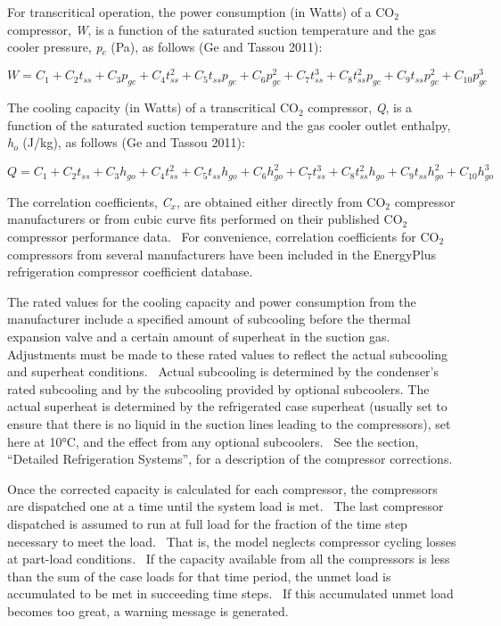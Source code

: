 For transcritical operation, the power consumption (in Watts) of a CO\(_{2}\) compressor, \emph{W}, is a function of the saturated suction temperature and the gas cooler pressure, \emph{p\(_{c}\)} (Pa), as follows (Ge and Tassou 2011):

\begin{equation}
W = {C_1} + {C_2}{t_{ss}} + {C_3}{p_{gc}} + {C_4}t_{ss}^2 + {C_5}{t_{ss}}{p_{gc}} + {C_6}p_{gc}^2 + {C_7}t_{ss}^3 + {C_8}t_{ss}^2{p_{gc}} + {C_9}{t_{ss}}p_{gc}^2 + {C_{10}}p_{gc}^3
\end{equation}

The cooling capacity (in Watts) of a transcritical CO\(_{2}\) compressor, \emph{Q}, is a function of the saturated suction temperature and the gas cooler outlet enthalpy, \emph{h\(_{o}\)} (J/kg), as follows (Ge and Tassou 2011):

\begin{equation}
Q = {C_1} + {C_2}{t_{ss}} + {C_3}{h_{go}} + {C_4}t_{ss}^2 + {C_5}{t_{ss}}{h_{go}} + {C_6}h_{go}^2 + {C_7}t_{ss}^3 + {C_8}t_{ss}^2{h_{go}} + {C_9}{t_{ss}}h_{go}^2 + {C_{10}}h_{go}^3
\end{equation}

The correlation coefficients, \emph{C\(_{x}\)}, are obtained either directly from CO\(_{2}\) compressor manufacturers or from cubic curve fits performed on their published CO\(_{2}\) compressor performance data.~ For convenience, correlation coefficients for CO\(_{2}\) compressors from several manufacturers have been included in the EnergyPlus refrigeration compressor coefficient database.

The rated values for the cooling capacity and power consumption from the manufacturer include a specified amount of subcooling before the thermal expansion valve and a certain amount of superheat in the suction gas.~ Adjustments must be made to these rated values to reflect the actual subcooling and superheat conditions.~ Actual subcooling is determined by the condenser's rated subcooling and by the subcooling provided by optional subcoolers. The actual superheat is determined by the refrigerated case superheat (usually set to ensure that there is no liquid in the suction lines leading to the compressors), set here at 10°C, and the effect from any optional subcoolers.~ See the section, ``Detailed Refrigeration Systems'', for a description of the compressor corrections.

Once the corrected capacity is calculated for each compressor, the compressors are dispatched one at a time until the system load is met.~ The last compressor dispatched is assumed to run at full load for the fraction of the time step necessary to meet the load.~ That is, the model neglects compressor cycling losses at part-load conditions.~ If the capacity available from all the compressors is less than the sum of the case loads for that time period, the unmet load is accumulated to be met in succeeding time steps.~ If this accumulated unmet load becomes too great, a warning message is generated.

